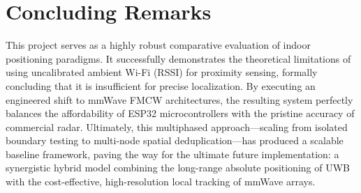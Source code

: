 \section{Concluding Remarks}

This project serves as a highly robust comparative evaluation of indoor positioning paradigms. It successfully demonstrates the theoretical limitations of using uncalibrated ambient Wi-Fi (RSSI) for proximity sensing, formally concluding that it is insufficient for precise localization. By executing an engineered shift to mmWave FMCW architectures, the resulting system perfectly balances the affordability of ESP32 microcontrollers with the pristine accuracy of commercial radar. Ultimately, this multiphased approach—scaling from isolated boundary testing to multi-node spatial deduplication—has produced a scalable baseline framework, paving the way for the ultimate future implementation: a synergistic hybrid model combining the long-range absolute positioning of UWB with the cost-effective, high-resolution local tracking of mmWave arrays.

